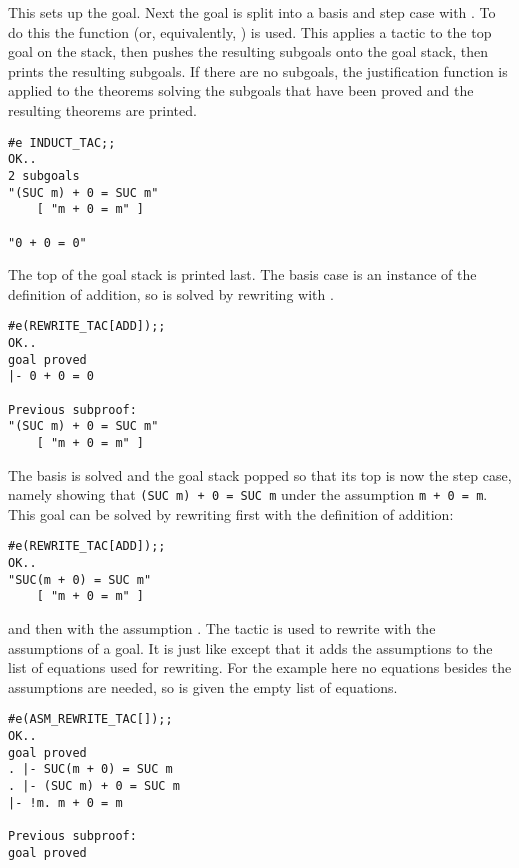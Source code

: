 \noindent This sets up the goal. Next the goal is split into a basis and step case
with . To do this the function  (or, equivalently,
) is used. This applies a tactic to the top goal on the stack, then
pushes the resulting subgoals onto the goal stack, then prints the resulting
subgoals. If there are no subgoals, the justification function is applied to the
theorems solving the subgoals that have been proved and the resulting theorems are
printed.

\begin{session}\begin{verbatim}
#e INDUCT_TAC;;
OK..
2 subgoals
"(SUC m) + 0 = SUC m"
    [ "m + 0 = m" ]

"0 + 0 = 0"
\end{verbatim}\end{session}

\noindent The top of the goal stack is printed last. The basis case
is an instance of the definition of addition, so is solved by rewriting with
.

\begin{session}\begin{verbatim}
#e(REWRITE_TAC[ADD]);;
OK..
goal proved
|- 0 + 0 = 0

Previous subproof:
"(SUC m) + 0 = SUC m"
    [ "m + 0 = m" ]
\end{verbatim}\end{session}

\noindent The basis is solved and the goal
stack popped so that its top is now the step case, namely showing
that {\small\verb|(SUC m) + 0 = SUC m|} under the assumption
{\small\verb|m + 0 = m|}. This goal can be solved by rewriting first
with the definition of addition:

\begin{session}\begin{verbatim}
#e(REWRITE_TAC[ADD]);;
OK..
"SUC(m + 0) = SUC m"
    [ "m + 0 = m" ]
\end{verbatim}\end{session}

\noindent and then with the assumption . The tactic
 is used to rewrite with the assumptions of a goal. It is
just like  except that it adds the assumptions to the list of
equations used for rewriting. For the example here no equations besides the
assumptions are needed, so  is given the empty list of
equations.

\begin{session}\begin{verbatim}
#e(ASM_REWRITE_TAC[]);;
OK..
goal proved
. |- SUC(m + 0) = SUC m
. |- (SUC m) + 0 = SUC m
|- !m. m + 0 = m

Previous subproof:
goal proved
\end{verbatim}\end{session}

